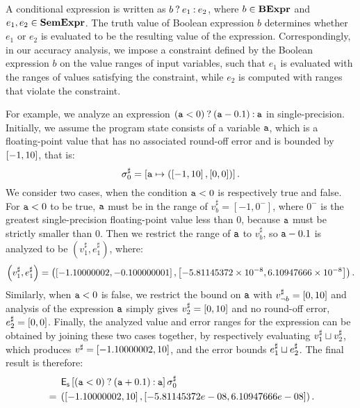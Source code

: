 A conditional expression is written as $b\mathbin{?} e_1\mathbin{:} e_2$, where $b
\in \mathbf{BExpr}$ and $e_1, e_2 \in \mathbf{SemExpr}$.  The truth value of Boolean
expression $b$ determines whether $e_1$ or $e_2$ is evaluated to be the
resulting value of the expression.  Correspondingly, in our accuracy analysis,
we impose a constraint defined by the Boolean expression $b$ on the value
ranges of input variables, such that $e_1$ is evaluated with the ranges of
values satisfying the constraint, while $e_2$ is computed with ranges that
violate the constraint.

For example, we analyze an expression $(\texttt{a} < 0)\mathbin{?}(\texttt{a} -
0.1)\mathbin{:}\texttt{a}$ in single-precision.  Initially, we assume the program state
consists of a variable $\texttt{a}$, which is a floating-point value that has no
associated round-off error and is bounded by $\left[{-1}, {10}\right]$, that is:
\begin{equation}
    \sigma^\sharp_0 = \left[
        \texttt{a} \mapsto \left(
            \left[{-1}, {10}\right],
            \left[{0}, {0}\right]
        \right)
    \right].
\end{equation}
We consider two cases, when the condition $\texttt{a} < 0$ is respectively true and
false.  For $\texttt{a} < 0$ to be true, $\texttt{a}$ must be in the range of $v^\sharp_b
= [-1, 0^{-}]$, where $0^{-}$ is the greatest single-precision floating-point
value less than 0, because $\texttt{a}$ must be strictly smaller than $0$.  Then we
restrict the range of $\texttt{a}$ to $v^\sharp_b$, so $\texttt{a} - 0.1$ is analyzed to
be $(v^\sharp_1, e^\sharp_1)$, where:
\begin{equation}
    \left( v^\sharp_1, e^\sharp_1 \right) = \left(
        \left[{-1.10000002}, {-0.100000001}\right],
        \left[{-5.81145372\times10^{-8}}, {6.10947666\times10^{-8}}\right]
    \right).
\end{equation}
Similarly, when $\texttt{a} < 0$ is false, we restrict the bound on $\texttt{a}$
with $v^\sharp_{\neg b} = \left[{0}, {10}\right]$ and analysis of the expression
$\texttt{a}$ simply gives $v^\sharp_2 = \left[{0}, {10}\right]$ and no round-off error,
$e^\sharp_2 = \left[{0}, {0}\right]$.  Finally, the analyzed value and error ranges
for the expression can be obtained by joining these two cases together,
by respectively evaluating $v^\sharp_1 \sqcup v^\sharp_2$, which produces
$v^\sharp = \left[{-1.10000002}, {10}\right]$, and the error bounds $e^\sharp_1 \sqcup
e^\sharp_2$.  The final result is therefore:
\begin{equation}
    \begin{aligned}
        & \operatorname{\mathsf{E}_\mathsf{s}}\left[{
            \left(\texttt{a} < 0\right)\mathbin{?}\left(\texttt{a} + 0.1\right)\mathbin{:}\texttt{a}
        }\right]{\sigma^\sharp_0} \\
        {}={} & \left(
            \left[{-1.10000002}, {10}\right],
            \left[{-5.81145372e-08}, {6.10947666e-08}\right]
        \right).
    \end{aligned}
\end{equation}

